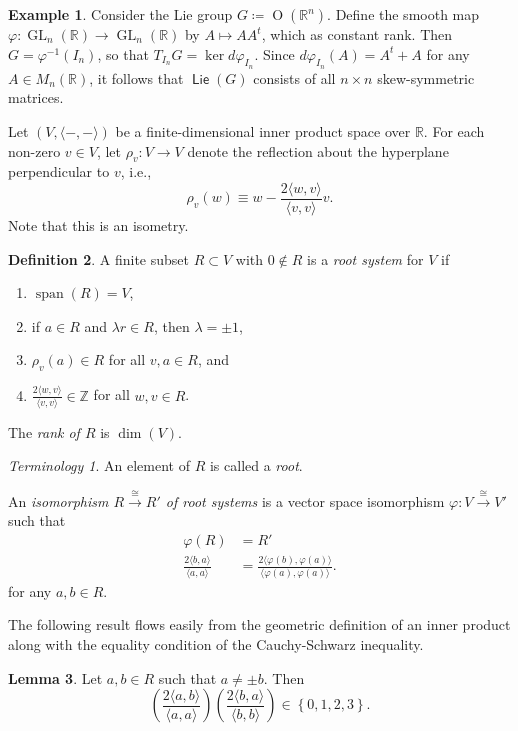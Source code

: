\documentclass[10pt,letterpaper,cm]{nupset}
\theoremstyle{definition}
\newtheorem{defn}{Definition}[subsection]
\newtheorem{exmp}[defn]{Example}
\theoremstyle{theorem}
\newtheorem{lemma}[defn]{Lemma}
\theoremstyle{remark}
\newtheorem*{term}{Terminology}
\newcommand{\R}{\mathbb{R}}
\newcommand{\Z}{\mathbb Z}
\newcommand{\1}{\mathbb{1}}
\newcommand{\0}{\vec 0}
\DeclareMathOperator*{\Span}{span}
\DeclareMathOperator{\GL}{GL}
\DeclareMathOperator{\Or}{O}
\DeclareMathOperator{\lie}{\mathsf{Lie}}
\newcommand{\be}{\begin{enumerate}}
\newcommand{\ee}{\end{enumerate}}
\begin{document}
\begin{exmp}
Consider the Lie group $G \coloneqq \Or(\R^n)$. Define the smooth map $\varphi : \GL_n(\R) \to \GL_n(\R)$ by $A\mapsto AA^t$, which as constant rank.  Then $G = \varphi^{-1}(I_n)$, so that $T_{I_n}{G} = \ker{d{\varphi}_{I_n}}$. Since $d{\varphi}_{I_n}(A) = A^t + A$ for any $A \in M_n(\R)$, it follows that $\lie(G)$ consists of all $n\times n$ skew-symmetric matrices. 
\end{exmp}

\medskip

Let $\left(V, \langle{-}, {-}\rangle\right)$ be a finite-dimensional inner product space over $\R$. For each non-zero $v\in V$, let $\rho_v : V \to V$ denote the reflection about the hyperplane perpendicular to $v$, i.e.,
\[
\rho_v(w) \equiv w - \frac{2\langle w, v\rangle}{\langle v, v\rangle}v.
\] Note that this is an isometry.

\begin{defn}
A finite subset $R \subset V$ with $0\notin R$ is a \textit{root system} for $V$ if
\be[label=(\roman*)]
\item $\Span(R)=V$, 
\item if $a\in R$ and $\lambda{r} \in R$, then $\lambda =\pm 1$, 
\item $\rho_v(a)\in R$ for all $v,a\in R$, and 
\item $\frac{2\langle w, v\rangle}{\langle v, v\rangle} \in \Z$ for all $w,v\in R$.
\ee
The \textit{rank of $R$} is $\dim(V)$.
\end{defn}

\begin{term}
An element of $R$ is called a \textit{root}.
\end{term}


An \textit{isomorphism $R\overset{\cong}{\longrightarrow}R'$ of root systems} is a vector space isomorphism  $\varphi : V \overset{\cong}{\longrightarrow} V'$ such that 
\begin{align*}
\varphi(R) & = R' 
\\ \frac{2\langle b, a\rangle}{\langle a, a\rangle} &= \frac{2\langle \varphi(b),\varphi(a)\rangle}{\langle \varphi(a), \varphi(a)\rangle}.
\end{align*} for any $a,b\in R$.


\smallskip


The following result flows easily from the geometric definition of an inner product along with the equality condition of the Cauchy-Schwarz inequality.

\begin{lemma}
Let $a,b\in R$ such that $a\ne \pm b$. Then $$\left(\frac{2\langle a, b\rangle}{\langle a, a\rangle} \right) \left(\frac{2\langle b, a\rangle}{\langle b, b\rangle}\right) \in \left\{0,1,2,3\right\}.$$
\end{lemma}
\end{document}
